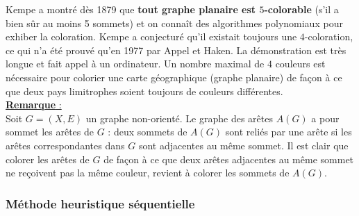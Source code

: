 \documentclass{article}
\begin{document}
Kempe a montré dès 1879 que \textbf{tout graphe planaire est $5$-colorable} (s’il a bien sûr au moins 5 sommets) et on connaît des algorithmes polynomiaux pour exhiber la 
coloration. Kempe a conjecturé qu’il existait toujours une $4$-coloration, ce qui n’a été prouvé qu’en 1977 par Appel et Haken. La démonstration est très longue et fait appel à un 
ordinateur. Un nombre maximal de $4$ couleurs est nécessaire pour colorier une carte géographique (graphe planaire) de façon à ce que deux pays limitrophes soient toujours de 
couleurs différentes. \\

\noindent\underline{\textbf{Remarque} :}  \\

Soit $G=(X,E)$ un graphe non-orienté. Le graphe des arêtes $A(G)$ a pour sommet les arêtes de $G$ : deux sommets de $A(G)$ sont reliés par une arête si les arêtes 
correspondantes dans $G$ sont adjacentes au même sommet. Il est clair que colorer les arêtes de $G$ de façon à ce que deux arêtes adjacentes au même sommet ne reçoivent pas 
la même couleur, revient à colorer les sommets de $A(G)$.

\subsubsection{Méthode heuristique séquentielle}
\end{document}
